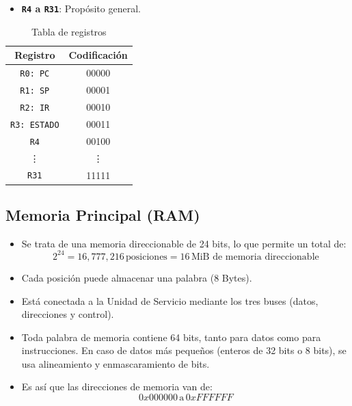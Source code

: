 \documentclass{article}
\begin{document}
\begin{itemize}
  \item \textbf{\texttt{R4} a \texttt{R31}}: Propósito general.
\end{itemize}

\begin{table}[H]
  \centering
  \begin{tabular}{|c|c|}
    \hline
    \textbf{Registro}   & \textbf{Codificación} \\
    \hline
    \texttt{R0: PC}     & 00000                 \\
    \texttt{R1: SP}     & 00001                 \\
    \texttt{R2: IR}     & 00010                 \\
    \texttt{R3: ESTADO} & 00011                 \\
    \texttt{R4}         & 00100                 \\
    \vdots              & \vdots                \\
    \texttt{R31}        & 11111                 \\
    \hline
  \end{tabular}
  \caption{Tabla de registros}
\end{table}

\subsection{Memoria Principal (RAM)}

\begin{itemize}
  \item Se trata de una memoria direccionable de 24 bits, lo que permite un total de:
        \[
          2^{24} = 16,777,216 \, \text{posiciones} = 16 \, \text{MiB de memoria direccionable}
        \]
  \item Cada posición puede almacenar una palabra (8 Bytes).
  \item Está conectada a la Unidad de Servicio mediante los tres buses (datos, direcciones y control).
  \item Toda palabra de memoria contiene 64 bits, tanto para datos como para instrucciones. En caso de datos más pequeños (enteros de 32 bits o 8 bits), se usa alineamiento y enmascaramiento de bits.
  \item Es así que las direcciones de memoria van de:
        \[
          0x000000 \, \text{a} \, 0xFFFFFF
        \]
\end{itemize}
\end{document}
